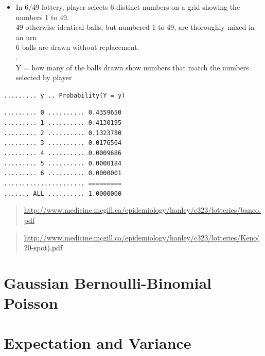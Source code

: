 \documentclass[]{book}
\providecommand{\tightlist}{%
  \setlength{\itemsep}{0pt}\setlength{\parskip}{0pt}}
\begin{document}
\begin{itemize}
\tightlist
\item
  In 6/49 lottery, player selects 6 distinct numbers on a grid showing the numbers 1 to 49.\\
  49 otherwise identical balls, but numbered 1 to 49, are thoroughly mixed in an urn\\
  6 balls are drawn without replacement.\\
  .\\
  Y = how many of the balls drawn show numbers that match the numbers selected by player
\end{itemize}

\texttt{.........\ y\ ..\ Probability(Y\ =\ y)}

\texttt{.........\ 0\ ..........\ 0.4359650}\\
\texttt{.........\ 1\ ..........\ 0.4130195}~\\
\texttt{.........\ 2\ ..........\ 0.1323780}~\\
\texttt{.........\ 3\ ..........\ 0.0176504}~\\
\texttt{.........\ 4\ ..........\ 0.0009686}~\\
\texttt{.........\ 5\ ..........\ 0.0000184}~\\
\texttt{.........\ 6\ ..........\ 0.0000001}~\\
\texttt{......................\ =========}~\\
\texttt{.......\ ALL\ ..........\ 1.0000000}

\begin{quote}
\url{http://www.medicine.mcgill.ca/epidemiology/hanley/c323/lotteries/banco.pdf}
\end{quote}

\begin{quote}
\url{http://www.medicine.mcgill.ca/epidemiology/hanley/c323/lotteries/Keno(20-spot).pdf}
\end{quote}

\hypertarget{gaussian-bernoulli-binomial-poisson}{%
\section{Gaussian Bernoulli-Binomial Poisson}\label{gaussian-bernoulli-binomial-poisson}}

\hypertarget{expectation-and-variance}{%
\section{Expectation and Variance}\label{expectation-and-variance}}
\end{document}
